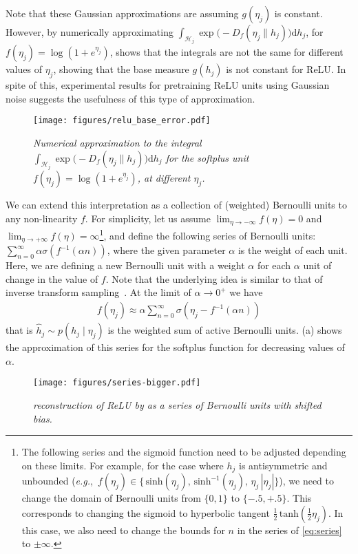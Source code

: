 \documentclass[twoside]{article}
\theoremstyle{plain}
\theoremstyle{definition}
\theoremstyle{remark}
\newcommand{\eg}[0]{\emph{e.g.},~}
\newcommand{\refEq}[1]{\cref{#1}}%
\newcommand{\boldit}[1]{\ensuremath{#1}}
\newcommand{\sfit}[1]{\ensuremath{#1}}
\newcommand{\y}[0]{\ensuremath{{h}}}%
\newcommand{\pp}[0]{\ensuremath{\sfit{p}}}%
\newcommand{\ff}[0]{\ensuremath{\sfit{f}}}%
\newcommand{\ffinv}[0]{\ensuremath{\sfit{f}^{-1}}}%
\newcommand{\DD}[0]{\ensuremath{\boldit{\sfit{D}}}}%
\newcommand{\gh}[0]{\ensuremath{\sfit{g}}}%
\newcommand{\YY}[0]{\ensuremath{\mathcal{H}}}%
\newcommand{\dd}[0]{\ensuremath{\mathrm{d}}}%
\begin{document}
Note that these Gaussian approximations are assuming $\gh(\eta_j)$ is constant. 
However, by numerically approximating $\int_{\YY_j} \exp\big(-\DD_{\ff}(\eta_j \| \y_j)\big) \dd \y_j$, for $\ff(\eta_j) = \log(1 + e^{\eta_j})$, 
 shows that the  integrals are not the same for different values of $\eta_j$, showing that the base measure $\gh(\y_j)$ is not constant for ReLU. %
In spite of this, experimental results for pretraining ReLU units using Gaussian noise
suggests the usefulness of this type of approximation. %

\begin{figure}
  \centering
\texttt{[image: figures/relu\_base\_error.pdf]} 
  \caption{\it \small  Numerical approximation to the integral $\int_{\YY_j} \exp\big(-\DD_{\ff}(\eta_j \| \y_j)\big) \dd \y_j$ for the softplus unit $\ff(\eta_j) = \log(1 + e^{\eta_j})$, at different $\eta_j$.} \label{fig:softplus_error}
\end{figure}


We can extend this interpretation as a collection of (weighted) Bernoulli units to any non-linearity $\ff$. For simplicity, let us assume $\lim_{\eta \to -\infty} \ff(\eta) = 0$ and $\lim_{\eta \to +\infty} \ff(\eta) = \infty$\footnote{The following series and the sigmoid function need to be adjusted depending on these limits. For example, for the case where $\y_j$ is antisymmetric and unbounded (\eg $\ff(\eta_j) \in \{\,\mathrm{sinh}(\eta_j),\, \mathrm{sinh^{-1}}(\eta_j),\, \eta_j\, | \eta_j|\} $), we need to change the domain of Bernoulli units from $\{0,1\}$ to $\{-.5,+.5\}$. This corresponds to changing the sigmoid to hyperbolic tangent $\frac{1}{2}\, \mathrm{tanh}(\frac{1}{2} \eta_j)$. In this case, we also need to change the bounds for $n$ in the series of \refEq{eq:series} to $\pm \infty$.}, and define the following series of Bernoulli units:
$
\sum_{n=0}^{\infty} \alpha \sigma(\ffinv(\alpha n))
$,
where the given parameter
$\alpha$ 
is the weight of each unit. Here, we are defining a new Bernoulli unit with a weight $\alpha$ for each $\alpha$ unit of change in the value of $\ff$. Note that the underlying idea is similar to that of inverse transform sampling~\citep{devroye1986non}.
At the limit of $\alpha \to 0^+$ we have
\begin{align}\label{eq:series}
  \ff(\eta_j) \approx \alpha \sum_{n=0}^{\infty}  \sigma(\eta_j - \ffinv(\alpha n))
\end{align}
that is $\hat{\y}_j \sim \pp(\y_j \mid \eta_j)$ is the weighted sum of active Bernoulli units. 
(a) shows the approximation of this series for the softplus function for decreasing values of $\alpha$.
\begin{figure}
  \centering
\texttt{[image: figures/series-bigger.pdf]} \label{fig:series}
  \caption{\it \small  reconstruction of ReLU by as a series of Bernoulli units with shifted bias.}
\end{figure}
\end{document}
